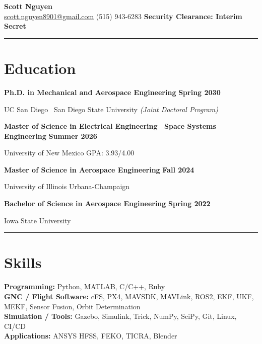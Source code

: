 \documentclass[10pt]{article}
\newcommand{\sectionline}{\noindent\rule{\linewidth}{0.4pt}}
\begin{document}
	\fontsize{9.5}{11}\selectfont
	
	\begin{center}
		{\color{mygreen}
			{\Huge \textbf{Scott Nguyen}} \\
			\small
			\href{mailto:scott.nguyen8901@gmail.com}{scott.nguyen8901@gmail.com} \hspace{0.1cm}\textbar\hspace{0.1cm}
			(515) 943-6283\hspace{0.1cm}\textbar\hspace{0.1cm}
			\textbf{Security Clearance: Interim Secret}
		}
	\end{center}
	
	\sectionline
	
	\section*{Education}
	
	\textbf{Ph.D. in Mechanical and Aerospace Engineering} \hfill \textbf{Spring 2030}
	
	UC San Diego \textbar\ San Diego State University \textit{(Joint Doctoral Program)}
	
	\textbf{Master of Science in Electrical Engineering \textbar\ Space Systems Engineering} \hfill \textbf{Summer 2026}
	
	University of New Mexico \hfill GPA: 3.93/4.00
	
	\textbf{Master of Science in Aerospace Engineering} \hfill \textbf{Fall 2024}
	
	University of Illinois Urbana-Champaign
	
	\textbf{Bachelor of Science in Aerospace Engineering} \hfill \textbf{Spring 2022}
	
	Iowa State University

	\sectionline
	
	\section*{Skills}
	\textbf{Programming:} Python, MATLAB, C/C++, Ruby \\
	\textbf{GNC / Flight Software:} cFS, PX4, MAVSDK, MAVLink, ROS2, EKF, UKF, MEKF, Sensor Fusion, Orbit Determination \\
	\textbf{Simulation / Tools:} Gazebo, Simulink, Trick, NumPy, SciPy, Git, Linux, CI/CD \\
	\textbf{Applications:} ANSYS HFSS, FEKO, TICRA, Blender
	
\end{document}
